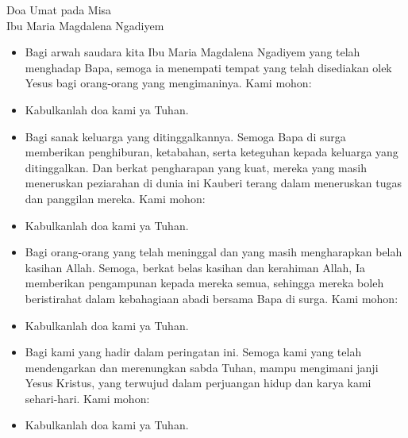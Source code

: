 \documentclass{article}
\newcommand{\BU}[1]{\begin{itemize} \item[U:] #1 \end{itemize}}
\newcommand{\BP}[1]{\begin{itemize} \item[P:] #1 \end{itemize}}
\newcommand{\arwah}{Ibu Maria Magdalena Ngadiyem }
\begin{document}
\begin{center}\large{Doa Umat pada Misa \\ \arwah }\end{center}

\BP{Bagi arwah saudara kita \arwah yang telah menghadap
Bapa, semoga ia menempati tempat yang telah disediakan olek Yesus bagi orang-orang yang
mengimaninya. Kami mohon:}

\BU{Kabulkanlah doa kami ya Tuhan.}

\BP{Bagi sanak keluarga yang ditinggalkannya. Semoga Bapa di surga memberikan penghiburan,
ketabahan, serta keteguhan kepada keluarga yang ditinggalkan.  Dan  berkat  pengharapan yang
kuat, mereka yang masih meneruskan peziarahan di dunia ini Kauberi terang dalam meneruskan
tugas dan panggilan mereka. Kami mohon:}

\BU{Kabulkanlah doa kami ya Tuhan.}

\BP{Bagi orang-orang yang telah meninggal dan
yang masih mengharapkan belah kasihan Allah.
Semoga, berkat belas kasihan dan kerahiman
Allah, Ia memberikan pengampunan kepada
mereka semua, sehingga mereka boleh beristirahat dalam kebahagiaan abadi bersama Bapa
di surga. Kami mohon:}

\BU{Kabulkanlah doa kami ya Tuhan.}

\BP{Bagi kami yang hadir dalam peringatan ini.
Semoga kami yang telah mendengarkan dan merenungkan sabda Tuhan, mampu mengimani
janji Yesus Kristus, yang terwujud dalam perjuangan hidup dan karya kami sehari-hari.
Kami mohon:}

\BU{Kabulkanlah doa kami ya Tuhan.}
\end{document}
